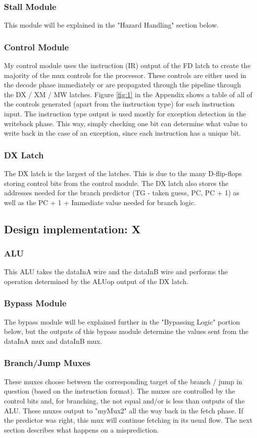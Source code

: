 \documentclass[letterpaper]{article} %
\begin{document}
\subsubsection{Stall Module}
This module will be explained in the "Hazard Handling" section below.
\subsubsection{Control Module}
My control module uses the instruction (IR) output of the FD latch to create the majority of the mux controls for the processor. These controls are either used in the decode phase immediately or are propagated through the pipeline through the DX / XM / MW latches. Figure \ref{fig:1} in the Appendix shows a table of all of the controls generated (apart from the instruction type) for each instruction input. The instruction type output is used mostly for exception detection in the writeback phase. This way, simply checking one bit can determine what value to write back in the case of an exception, since each instruction has a unique bit.
\subsubsection{DX Latch}
The DX latch is the largest of the latches. This is due to the many D-flip-flops storing control bits from the control module. The DX latch also stores the addresses needed for the branch predictor (TG - taken guess, PC, PC + 1) as well as the PC + 1 + Immediate value needed for branch logic.

\subsection{Design implementation: X}
\subsubsection{ALU}
This ALU takes the dataInA wire and the dataInB wire and performs the operation determined by the ALUop output of the DX latch.
\subsubsection{Bypass Module}
The bypass module will be explained further in the "Bypassing Logic" portion below, but the outputs of this bypass module determine the values sent from the dataInA mux and dataInB mux.
\subsubsection{Branch/Jump Muxes}
These muxes choose between the corresponding target of the branch / jump in question (based on the instruction format). The muxes are controlled by the control bits and, for branching, the not equal and/or is less than outputs of the ALU. These muxes output to "myMux2" all the way back in the fetch phase. If the predictor was right, this mux will continue fetching in its usual flow. The next section describes what happens on a misprediction.
\end{document}
